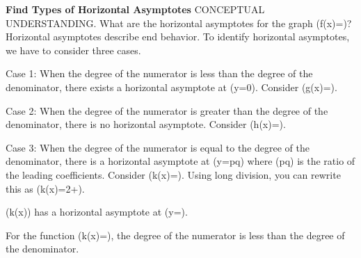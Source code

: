 \documentclass{article}
\newenvironment{example}[1]{}{}         %
\newcommand{\answer}[1]{}               %
\newcommand{\placeholder}[2]{}          %
\newcommand{\te}[1]{}                   %
\begin{document}
\begin{example}{3}
\textbf{Find Types of Horizontal Asymptotes}
CONCEPTUAL UNDERSTANDING.
What are the horizontal asymptotes for the graph (f(x)=)?
Horizontal asymptotes describe end behavior. To identify horizontal asymptotes, we have to consider three cases.
\te{STUDY TIP: The vertical asymptote(s) are found by setting the denominator of the function equal to zero. The horizontal asymptote(s) are found using the relationship between the degree of the numerator and the degree of the denominator.}
Case 1: When the degree of the numerator is less than the degree of the denominator, there exists a horizontal asymptote at (y=0).
Consider (g(x)=).
\te{As (|x|\to\infty) the value of the denominator gets very large in relation to the numerator. The value of the function gets closer and closer to 0.}
\placeholder{graph}{Red g(x)=(x+4)/(x^2+1), x,y axes,O, window approximately x -60 to60,y -2 to6; grid12 horizontally and1 vertically, labels x -48,-24,24,48,y2,4. Narrow peak near x0,y4, tails approach x-axis, both ends arrowed; no marked points or dashed lines.}
Case 2: When the degree of the numerator is greater than the degree of the denominator, there is no horizontal asymptote.
Consider (h(x)=).
\te{As (|x|\to\infty), the value of the numerator gets very large in relation to the denominator, so (y\to\pm\infty).}
\placeholder{graph}{Red h(x)=(x^2+1)/(x+2), x,y axes,O, window approximately x -25 to25,y -20 to15; grid5; labels x -20,-10,10,20,y -10,10. Negative left branch turns near(-4,-8) and falls at x=-2; right branch rises from a low point near(0,0.5) toward upper right. Four end arrows; no dashed asymptotes.}
Case 3: When the degree of the numerator is equal to the degree of the denominator, there is a horizontal asymptote at (y=\frac pq) where (\frac pq) is the ratio of the leading coefficients.
Consider (k(x)=).
Using long division, you can rewrite this as
(k(x)=2+).
\te{As (|x|\to\infty), the value of the rational expression approaches 0, so the value of the function approaches 2.}
\placeholder{graph}{Red k(x)=(2x^2+x+1)/(x^2-1), axes x,y,O; window x -20 to20,y -15 to15, grid x4,y3; labels x -16,-8,8,16,y -12,-6,6,12. Three branches: outer positive branches approach y2, negative middle branch between x=-1 and1. End arrows; no dashed asymptotes or marked points.}
(k(x)) has a horizontal asymptote at (y=).
\te{MAKE SENSE AND PERSEVERE: To show that the horizontal asymptote is accurate, try substituting different values for (x) and see if the values for (y) approach the asymptote(s).}
For the function (k(x)=), the degree of the numerator is less than the degree of the denominator.
\te{Printed concluding sentence calls the original function k(x), although the prompt calls it f(x).}
\answer{It has a horizontal asymptote at (y=0).}
\end{example}
\end{document}
